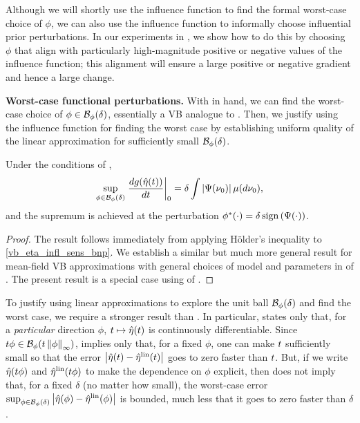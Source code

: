 Although we will shortly use the influence function to find the formal
worst-case choice of $\phi$, we can also use the influence function to
informally choose influential prior perturbations. In our experiments in
, we show how to do this by choosing $\phi$ that align with
particularly high-magnitude positive or negative values of the influence
function; this alignment will ensure a large positive or negative gradient and
hence a large change.

\noindent \textbf{Worst-case functional perturbations.}
%
With  in hand, we can find the worst-case
choice of $\phi \in \mathcal{B}_\phi(\delta)$, essentially a VB analogue to
\citet[Result 11]{gustafson:1996:local}.
Then, we justify using the influence function for finding the worst case by
establishing uniform quality of the linear approximation for sufficiently small
$\mathcal{B}_\phi(\delta)$.

\LinfExamplesFig{}

\begin{cor}
%
Under the conditions of ,
%
\begin{align*}
%
\sup_{\phi \in \ball_\phi(\delta)}
    \fracat{d g(\etaopt(\t))}{d \t}{0} =
        \delta \int \abs{\infl(\nu_0)} \mu(d\nu_0),
%
\end{align*}
%
and the supremum is achieved at the perturbation
$\phi^*(\cdot) = \delta \, \mathrm{sign}\left(\Psi(\cdot)\right)$.
%
\end{cor}
%
\begin{proof}
%
The result follows immediately from applying H{\"o}lder's inequality to
\eqref{vb_eta_infl_sens_bnp}. We establish a similar but much more general
result for mean-field VB approximations with general choices of model and
parameters in  of . The
present result is a special case using  of
.
%
\end{proof}

To justify using linear approximations to explore the unit ball
$\mathcal{B}_\phi(\delta)$ and find the worst case, we require a stronger result than
. In particular,  states
only that, for a {\em particular} direction $\phi$, $t \mapsto \hat\eta(t)$ is
continuously differentiable.  Since $t \phi \in \mathcal{B}_\phi(t \left\Vert\phi\right\Vert_{\infty})$,
 implies only that, for a fixed $\phi$, one can make
$t$ sufficiently small so that the error $\left|\hat\eta(t) - \hat\eta^{\mathrm{lin}}(t)\right|$ goes
to zero faster than $t$. But, if we write $\hat\eta(t\phi)$ and $\hat\eta^{\mathrm{lin}}(t
\phi)$ to make the dependence on $\phi$ explicit, then
 does not imply that, for a fixed $\delta$ (no matter
how small), the worst-case error $\sup_{\phi \in \mathcal{B}_\phi(\delta)}
\left|\hat\eta(\phi) - \hat\eta^{\mathrm{lin}}(\phi)\right|$ is bounded, much less that it goes to zero
faster than $\delta$.

